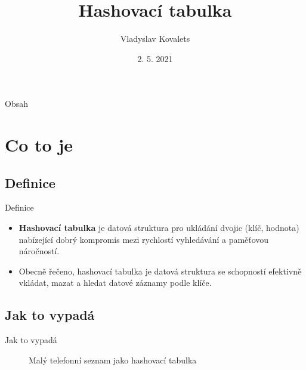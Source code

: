 \documentclass[utf8x]{beamer}
\title{Hashovací tabulka}
\author{Vladyslav Kovalets}
\institute[xkoval21]{\\Vysoké učenie technické v~Brne \\Fakulta informačních technológií}
\date{\scriptsize{2. 5. 2021}}
\begin{document}
\begin{frame}
  \titlepage
\end{frame}

\begin{frame}{Obsah}
  \tableofcontents
\end{frame}

\section{Co to je}

\subsection{Definice}

\begin{frame}{Definice}
  \begin{itemize}[<+->]
  \item {
    \textbf{Hashovací tabulka} je datová struktura pro ukládání dvojic (klíč, hodnota) nabízející dobrý kompromis mezi rychlostí vyhledávání a paměťovou náročností.
  }

  \item {
    Obecně řečeno, hashovací tabulka je datová struktura se schopností efektivně vkládat, mazat a hledat datové záznamy podle klíče.
  }
  \end{itemize}

\end{frame}

\subsection{Jak to vypadá}
\begin{frame}{Jak to vypadá}

   \begin{figure}[h]

\centering
{}
\caption{Malý telefonní seznam jako hashovací tabulka}

\end{figure}
  \end{frame}
  
\end{document}
